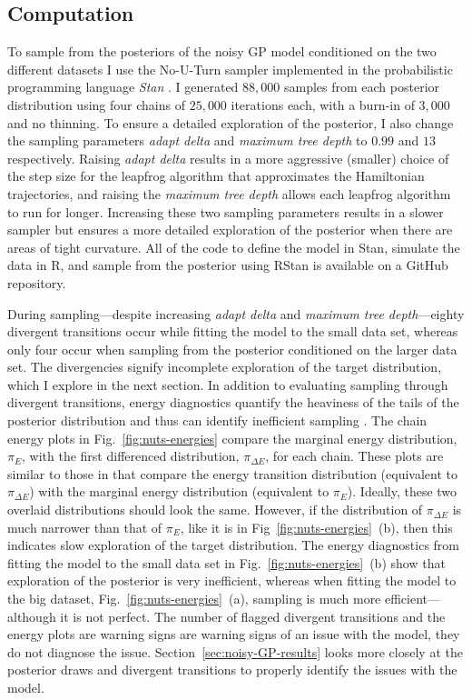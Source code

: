 \subsection{Computation}

To sample from the posteriors of the noisy GP model conditioned on the two different datasets I use the No-U-Turn sampler implemented in the probabilistic programming language \textit{Stan} \citep{Stan2022}. I generated $88,000$ samples from each posterior distribution using four chains of $25,000$ iterations each, with a burn-in of $3,000$ and no thinning. To ensure a detailed exploration of the posterior, I also change the sampling parameters \textit{adapt delta} and \textit{maximum tree depth} to $0.99$ and $13$ respectively. Raising \textit{adapt delta} results in a more aggressive (smaller) choice of the step size for the leapfrog algorithm that approximates the Hamiltonian trajectories, and raising the \textit{maximum tree depth} allows each leapfrog algorithm to run for longer. Increasing these two sampling parameters results in a slower sampler but ensures a more detailed exploration of the posterior when there are areas of tight curvature. All of the code to define the model in Stan, simulate the data in R, and sample from the posterior using RStan is available on a GitHub repository.

During sampling---despite increasing \textit{adapt delta} and \textit{maximum tree depth}---eighty divergent transitions occur while fitting the model to the small data set, whereas only four occur when sampling from the posterior conditioned on the larger data set. The divergencies signify incomplete exploration of the target distribution, which I explore in the next section. In addition to evaluating sampling through divergent transitions, energy diagnostics quantify the heaviness of the tails of the posterior distribution and thus can identify inefficient sampling \citep{bayesplot}. The chain energy plots in Fig.~\ref{fig:nuts-energies} compare the marginal energy distribution, $\pi_E$, with the first differenced distribution, $\pi_{\Delta E}$, for each chain. These plots are similar to those in \citet{betancourt_2017} that compare the energy transition distribution (equivalent to $\pi_{\Delta E}$) with the marginal energy distribution (equivalent to $\pi_E$). Ideally, these two overlaid distributions should look the same. However, if the distribution of $\pi_{\Delta E}$ is much narrower than that of $\pi_E$, like it is in Fig~\ref{fig:nuts-energies}~(b), then this indicates slow exploration of the target distribution. The energy diagnostics from fitting the model to the small data set in Fig.~\ref{fig:nuts-energies}~(b) show that exploration of the posterior is very inefficient, whereas when fitting the model to the big dataset, Fig.~\ref{fig:nuts-energies}~(a), sampling is much more efficient---although it is not perfect. The number of flagged divergent transitions and the energy plots are warning signs are warning signs of an issue with the model, they do not diagnose the issue. Section~\ref{sec:noisy-GP-results} looks more closely at the posterior draws and divergent transitions to properly identify the issues with the model.

